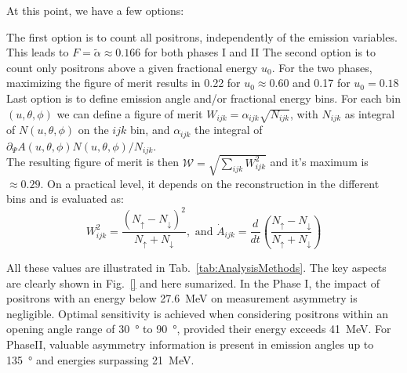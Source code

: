 \begin{refsection}
    At this point, we have a few options:
    \begin{outline}
        \1[A] The first option is to count all positrons, independently of the emission variables. This leads to $F=\tilde\alpha \approx 0.166$ for both phases I and II
        \1[T] The second option is to count only positrons above a given fractional energy $u_0$. For the two phases, maximizing the figure of merit results in 0.22 for $u_0\approx0.60$ and 0.17 for $u_0=0.18$
        \1[W] Last option is to define emission angle and/or fractional energy bins. 
        For each bin $(u, \theta, \phi)$ we can define a figure of merit $W_{ijk} = \alpha_{ijk} \sqrt{N_{ijk}}$, with $N_{ijk}$ as integral of $ N(u, \theta, \phi)$ on the $ijk$ bin, and $\alpha_{ijk}$ the integral of $ \partial_\Psi A(u,
	\theta, \phi) N(u, \theta, \phi) / N_{ijk}$.\\
        The resulting figure of merit is then $\mathcal{W} =  \sqrt{\sum_{ijk} W_{ijk}^2}$ and it's maximum is $\approx0.29$.
        On a practical level, it depends on the reconstruction in the different bins and is evaluated as:
        $$W^2_{ijk} = \frac{(N_\uparrow - N_\downarrow)^2}{N_\uparrow + N_\downarrow},\text{ and }  \dot A_{ijk} = \frac{d}{dt} \left( \frac{N_\uparrow - N_\downarrow}{N_\uparrow + N_\downarrow} \right)$$
    \end{outline}
    All these values are illustrated in Tab.~\ref{tab:AnalysisMethods}. 
    The key aspects are clearly shown in Fig.~\ref{} and here sumarized.
    In the Phase I, the impact of positrons with an energy below \SI{27.6}{MeV} on measurement asymmetry is negligible. 
    Optimal sensitivity is achieved when considering positrons within an opening angle range of \SI{30}{\degree} to \SI{90}{\degree}, provided their energy exceeds \SI{41}{MeV}. 
    For PhaseII, valuable asymmetry information is present in emission angles up to \SI{135}{\degree} and energies surpassing \SI{21}{MeV}.
    

\end{refsection}
